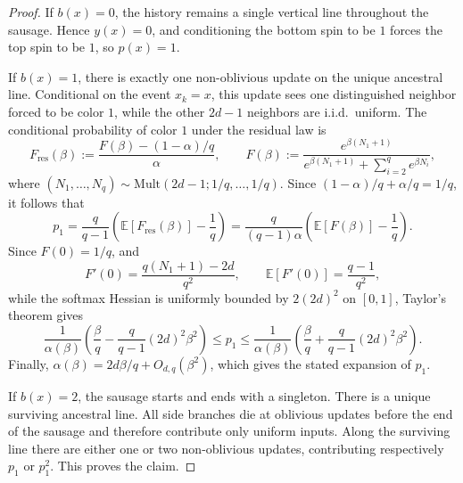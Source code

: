 \documentclass[letterpaper,11pt,reqno]{amsart}
\theoremstyle{definition}
\begin{document}
\begin{proof}
If \(b(x)=0\), the history remains a single vertical line throughout the sausage. Hence
\(y(x)=0\), and conditioning the bottom spin to be \(1\) forces the top spin to be \(1\), so \(p(x)=1\).

If $b(x)=1$, there is exactly one non-oblivious update on the unique ancestral line. Conditional on the event \(x_k=x\), this update sees one distinguished neighbor forced to be color \(1\), while the other \(2d-1\) neighbors are i.i.d.\ uniform. The conditional probability of color \(1\) under the residual law is
\[
F_{\mathrm{res}}(\beta)
:=
\frac{F(\beta)-(1-\alpha)/q}{\alpha},
\qquad
F(\beta):=\frac{e^{\beta(N_1+1)}}{e^{\beta(N_1+1)}+\sum_{i=2}^q e^{\beta N_i}},
\]
where
$(N_1,\dots,N_q)\sim\mathrm{Mult}(2d-1;1/q,\dots,1/q)$.
Since \((1-\alpha)/q+\alpha/q=1/q\), it follows that
\[
p_1
=
\frac{q}{q-1}\left(\mathbb E[F_{\mathrm{res}}(\beta)]-\frac1q\right)
=
\frac{q}{(q-1)\alpha}
\left(\mathbb E[F(\beta)]-\frac1q\right).
\]
Since \(F(0)=1/q\), 
and
\[
F'(0)=\frac{q(N_1+1)-2d}{q^2},
\qquad
\mathbb E[F'(0)]=\frac{q-1}{q^2},
\]
while the softmax Hessian is uniformly bounded by \(2(2d)^2\) on \([0,1]\), Taylor's theorem
gives 
\[
\frac{1}{\alpha(\beta)}
\left(
\frac{\beta}{q}-\frac{q}{q-1}(2d)^2\beta^2
\right)
\le
p_1
\le
\frac{1}{\alpha(\beta)}
\left(
\frac{\beta}{q}+\frac{q}{q-1}(2d)^2\beta^2
\right).
\]
Finally, \(\alpha(\beta)=2d\beta/q+O_{d,q}(\beta^2)\), which gives the stated expansion of \(p_1\).


If \(b(x)=2\), the sausage starts and ends with a singleton. There is a unique surviving
ancestral line. All side branches die at oblivious updates before the end of the sausage and
therefore contribute only uniform inputs. Along the surviving line there are either one or two
non-oblivious updates, contributing respectively \(p_1\) or \(p_1^2\). This proves the claim.
\end{proof}
\end{document}
